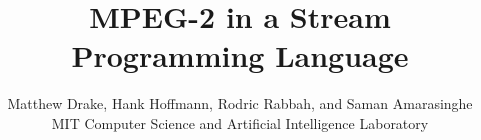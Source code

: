 \documentclass[times,12pt,onecolumn]{article}
\title{MPEG-2 in a Stream Programming Language}
\author{
  Matthew Drake, Hank Hoffmann, Rodric Rabbah, and Saman Amarasinghe\\
  MIT Computer Science and Artificial Intelligence Laboratory
}
\date{}
\begin{document}
\maketitle
\thispagestyle{empty}

\begin{abstract}

\end{abstract}





%


%





\end{document}
